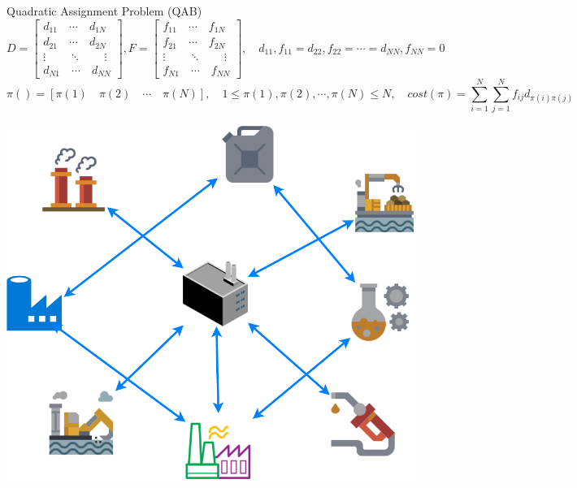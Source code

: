 \documentclass{beamer}
\begin{document}
\begin{frame}[t]{Quadratic Assignment Problem (QAB)} %
\tiny
\begin{equation}
D=
\left[ \begin{array}{ll}
d_{11} \quad \cdots \quad d_{1N}\\
d_{21} \quad \cdots \quad d_{2N}\\
\vdots  \quad \quad \ddots \quad \quad \vdots\\
d_{N1}  \quad \cdots \quad d_{NN}
\end{array} \right],
F=
\left[ \begin{array}{ll}
f_{11} \quad \cdots \quad f_{1N}\\
f_{21} \quad \cdots \quad f_{2N}\\
\vdots  \quad \quad \ddots \quad \quad \vdots\\
f_{N1}  \quad \cdots \quad f_{NN}
\end{array} \right], \quad
d_{11},f_{11}=d_{22},f_{22}=\cdots=d_{NN},f_{NN}=0
\end{equation}
\begin{equation}
\pi()=[\pi(1) \quad \pi(2) \quad \cdots \quad \pi(N)], \quad
1 \leq \pi(1),\pi(2),\cdots,\pi(N) \leq N, \quad
cost(\pi)=\sum_{i=1}^{N}\sum_{j=1}^{N}f_{ij}d_{\pi(i)\pi(j)}
\end{equation}
\begin{center}
\includegraphics[scale=0.3]{Fac}
\end{center}
\end{frame}
\end{document}

